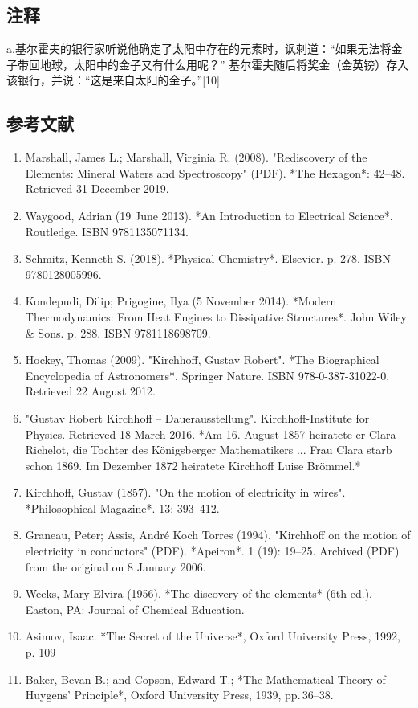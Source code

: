 \subsection{注释}  
a.基尔霍夫的银行家听说他确定了太阳中存在的元素时，讽刺道：“如果无法将金子带回地球，太阳中的金子又有什么用呢？” 基尔霍夫随后将奖金（金英镑）存入该银行，并说：“这是来自太阳的金子。”[10]
\subsection{参考文献}  
\begin{enumerate}
\item Marshall, James L.; Marshall, Virginia R. (2008). "Rediscovery of the Elements: Mineral Waters and Spectroscopy" (PDF). *The Hexagon*: 42–48. Retrieved 31 December 2019.  
\item Waygood, Adrian (19 June 2013). *An Introduction to Electrical Science*. Routledge. ISBN 9781135071134.  
\item Schmitz, Kenneth S. (2018). *Physical Chemistry*. Elsevier. p. 278. ISBN 9780128005996.  
\item Kondepudi, Dilip; Prigogine, Ilya (5 November 2014). *Modern Thermodynamics: From Heat Engines to Dissipative Structures*. John Wiley & Sons. p. 288. ISBN 9781118698709.  
\item Hockey, Thomas (2009). "Kirchhoff, Gustav Robert". *The Biographical Encyclopedia of Astronomers*. Springer Nature. ISBN 978-0-387-31022-0. Retrieved 22 August 2012.  
\item "Gustav Robert Kirchhoff – Dauerausstellung". Kirchhoff-Institute for Physics. Retrieved 18 March 2016. *Am 16. August 1857 heiratete er Clara Richelot, die Tochter des Königsberger Mathematikers ... Frau Clara starb schon 1869. Im Dezember 1872 heiratete Kirchhoff Luise Brömmel.*  
\item Kirchhoff, Gustav (1857). "On the motion of electricity in wires". *Philosophical Magazine*. 13: 393–412.  
\item Graneau, Peter; Assis, André Koch Torres (1994). "Kirchhoff on the motion of electricity in conductors" (PDF). *Apeiron*. 1 (19): 19–25. Archived (PDF) from the original on 8 January 2006.  
\item Weeks, Mary Elvira (1956). *The discovery of the elements* (6th ed.). Easton, PA: Journal of Chemical Education.  
\item Asimov, Isaac. *The Secret of the Universe*, Oxford University Press, 1992, p. 109  
\item Baker, Bevan B.; and Copson, Edward T.; *The Mathematical Theory of Huygens' Principle*, Oxford University Press, 1939, pp. 36–38.  

\end{enumerate}
